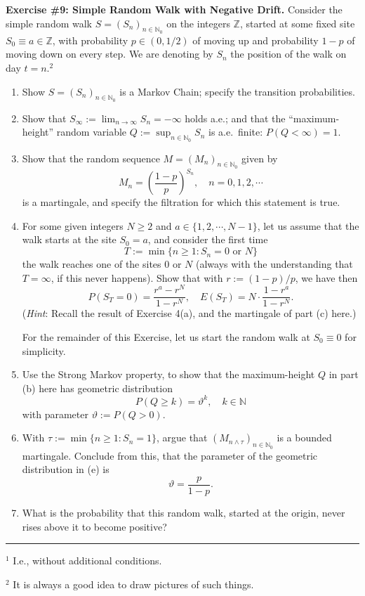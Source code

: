 \documentclass[12pt]{article}
\begin{document}
\bigskip

\noindent\textbf{Exercise \#9: Simple Random Walk with Negative Drift.} Consider the simple random walk $S = (S_n)_{n \in \mathbb{N}_0}$ on the integers $\mathbb{Z}$, started at some fixed site $S_0 \equiv a \in \mathbb{Z}$, with probability $p \in (0, 1/2)$ of moving up and probability $1-p$ of moving down on every step. We are denoting by $S_n$ the position of the walk on day $t = n$.$^2$

\begin{enumerate}
    \item[(a)] Show $S = (S_n)_{n \in \mathbb{N}_0}$ is a Markov Chain; specify the transition probabilities.

    \item[(b)] Show that $S_\infty := \lim_{n \to \infty} S_n = -\infty$ holds a.e.; and that the ``maximum-height'' random variable $Q := \sup_{n \in \mathbb{N}_0} S_n$ is a.e.\ finite: $P(Q < \infty) = 1$.

    \item[(c)] Show that the random sequence $M = (M_n)_{n \in \mathbb{N}_0}$ given by
    \[
        M_n = \left(\frac{1-p}{p}\right)^{S_n}, \quad n = 0, 1, 2, \cdots \tag{0.1}
    \]
    is a martingale, and specify the filtration for which this statement is true.

    \item[(d)] For some given integers $N \geq 2$ and $a \in \{1, 2, \cdots, N-1\}$, let us assume that the walk starts at the site $S_0 = a$, and consider the first time
    \[
        T := \min\{n \geq 1 : S_n = 0 \text{ or } N\} \tag{0.2}
    \]
    the walk reaches one of the sites $0$ or $N$ (always with the understanding that $T = \infty$, if this never happens). Show that with $r := (1-p)/p$, we have then
    \[
        P(S_T = 0) = \frac{r^a - r^N}{1 - r^N}, \quad E(S_T) = N \cdot \frac{1 - r^a}{1 - r^N}.
    \]
    (\textit{Hint}: Recall the result of Exercise 4(a), and the martingale of part (c) here.)

    \smallskip
    \noindent For the remainder of this Exercise, let us start the random walk at $S_0 \equiv 0$ for simplicity.

    \item[(e)] Use the Strong Markov property, to show that the maximum-height $Q$ in part (b) here has geometric distribution
    \[
        P(Q \geq k) = \vartheta^k, \quad k \in \mathbb{N} \tag{0.3}
    \]
    with parameter $\vartheta := P(Q > 0)$.

    \item[(f)] With $\tau := \min\{n \geq 1 : S_n = 1\}$, argue that $(M_{n \wedge \tau})_{n \in \mathbb{N}_0}$ is a bounded martingale. Conclude from this, that the parameter of the geometric distribution in (e) is
    \[
        \vartheta = \frac{p}{1-p}.
    \]

    \item[(g)] What is the probability that this random walk, started at the origin, never rises above it to become positive?
\end{enumerate}

\vspace{1cm}
\noindent\rule{0.5\textwidth}{0.4pt}

\noindent $^1$ I.e., without additional conditions.

\noindent $^2$ It is always a good idea to draw pictures of such things.
\end{document}
